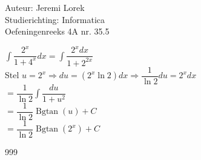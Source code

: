 \documentclass[a4paper]{article}
\begin{document}
\noindent \large Auteur: Jeremi Lorek\\
\noindent \large Studierichting: Informatica\\
\noindent \large Oefeningenreeks 4A nr. 35.5\\

\medskip
\normalsize

$\displaystyle \int \dfrac{2^x}{1 + 4^{x}} dx = \int \dfrac{2^x dx}{1 + 2^{2x}}$ \\

Stel $u = 2^x \Rightarrow du = (2^x \ln 2) dx \Rightarrow \dfrac{1}{\ln 2} du = 2^x dx $\\

$= \dfrac{1}{\ln 2} \displaystyle \int \dfrac{du}{1 + u^2}$ \\

$= \dfrac{1}{\ln 2} \operatorname{Bgtan}(u) + C$ \\

$= \dfrac{1}{\ln 2} \operatorname{Bgtan}(2^x) + C$ \\

\begin{thebibliography}{999}
\end{thebibliography}
\end{document}
